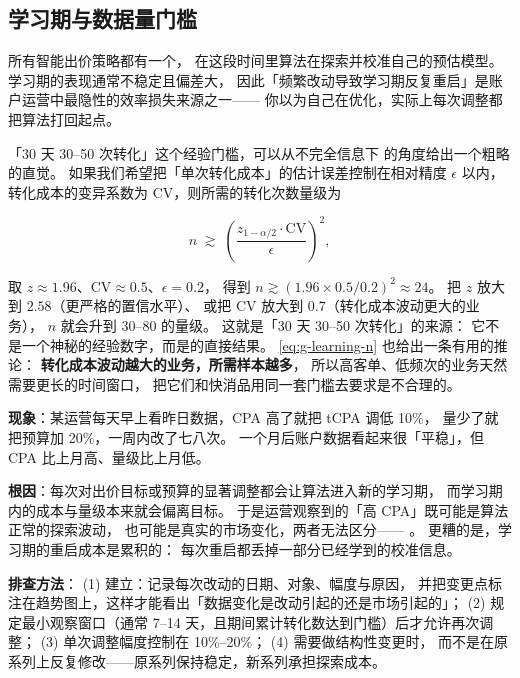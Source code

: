\subsection{学习期与数据量门槛}

所有智能出价策略都有一个，
在这段时间里算法在探索并校准自己的预估模型。
学习期的表现通常不稳定且偏差大，
因此「频繁改动导致学习期反复重启」是账户运营中最隐性的效率损失来源之一——
你以为自己在优化，实际上每次调整都把算法打回起点。

「30 天 30--50 次转化」这个经验门槛，可以从不完全信息下
的角度给出一个粗略的直觉。
如果我们希望把「单次转化成本」的估计误差控制在相对精度 $\epsilon$ 以内，
转化成本的变异系数为 $\mathrm{CV}$，则所需的转化次数量级为

\begin{equation}
n \;\gtrsim\; \left(\frac{z_{1-\alpha/2} \cdot \mathrm{CV}}{\epsilon}\right)^{2} ,
\label{eq:g-learning-n}
\end{equation}

取 $z \approx 1.96$、$\mathrm{CV} \approx 0.5$、$\epsilon = 0.2$，
得到 $n \gtrsim (1.96 \times 0.5 / 0.2)^2 \approx 24$。
把 $z$ 放大到 $2.58$（更严格的置信水平）、
或把 $\mathrm{CV}$ 放大到 $0.7$（转化成本波动更大的业务），
$n$ 就会升到 30--80 的量级。
这就是「30 天 30--50 次转化」的来源：
它不是一个神秘的经验数字，而是的直接结果。
\cref{eq:g-learning-n} 也给出一条有用的推论：
\textbf{转化成本波动越大的业务，所需样本越多}，
所以高客单、低频次的业务天然需要更长的时间窗口，
把它们和快消品用同一套门槛去要求是不合理的。

\begin{pitfall}[频繁改动出价与预算]
\textbf{现象}：某运营每天早上看昨日数据，CPA 高了就把 tCPA 调低 10\%，
量少了就把预算加 20\%，一周内改了七八次。
一个月后账户数据看起来很「平稳」，但 CPA 比上月高、量级比上月低。

\textbf{根因}：每次对出价目标或预算的显著调整都会让算法进入新的学习期，
而学习期内的成本与量级本来就会偏离目标。
于是运营观察到的「高 CPA」既可能是算法正常的探索波动，
也可能是真实的市场变化，两者无法区分——
。
更糟的是，学习期的重启成本是累积的：
每次重启都丢掉一部分已经学到的校准信息。

\textbf{排查方法}：
(1) 建立：记录每次改动的日期、对象、幅度与原因，
并把变更点标注在趋势图上，这样才能看出「数据变化是改动引起的还是市场引起的」；
(2) 规定最小观察窗口（通常 7--14 天，且期间累计转化数达到门槛）后才允许再次调整；
(3) 单次调整幅度控制在 10\%--20\%；
(4) 需要做结构性变更时，
而不是在原系列上反复修改——原系列保持稳定，新系列承担探索成本。
\end{pitfall}

